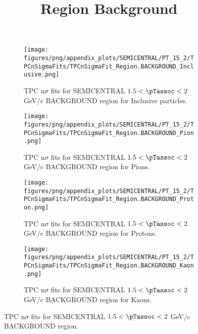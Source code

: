             \begin{figure}[H]
                \title{Region Background}
                \begin{subfigure}[b]{0.5\textwidth}
                    \centering
                    \texttt{[image: figures/png/appendix\_plots/SEMICENTRAL/PT\_15\_2/TPCnSigmaFits/TPCnSigmaFit\_Region.BACKGROUND\_Inclusive.png]}
                    \caption{TPC n$\sigma$ fits for SEMICENTRAL $1.5 < \pTassoc < 2$ GeV/c BACKGROUND region for Inclusive particles.}
                    \label{fig:appendix_SEMICENTRAL_$1.5 < \pTassoc < 2$ GeV/c_BACKGROUND_Inclusive}
                \end{subfigure}
                \begin{subfigure}[b]{0.5\textwidth}
                    \centering
                    \texttt{[image: figures/png/appendix\_plots/SEMICENTRAL/PT\_15\_2/TPCnSigmaFits/TPCnSigmaFit\_Region.BACKGROUND\_Pion.png]}
                    \caption{TPC n$\sigma$ fits for SEMICENTRAL $1.5 < \pTassoc < 2$ GeV/c BACKGROUND region for Pions.}
                    \label{fig:appendix_SEMICENTRAL_$1.5 < \pTassoc < 2$ GeV/c_BACKGROUND_Pion}
                \end{subfigure}
                \begin{subfigure}[b]{0.5\textwidth}
                    \centering
                    \texttt{[image: figures/png/appendix\_plots/SEMICENTRAL/PT\_15\_2/TPCnSigmaFits/TPCnSigmaFit\_Region.BACKGROUND\_Proton.png]}
                    \caption{TPC n$\sigma$ fits for SEMICENTRAL $1.5 < \pTassoc < 2$ GeV/c BACKGROUND region for Protons.}
                    \label{fig:appendix_SEMICENTRAL_$1.5 < \pTassoc < 2$ GeV/c_BACKGROUND_Proton}
                \end{subfigure}
                \begin{subfigure}[b]{0.5\textwidth}
                    \centering
                    \texttt{[image: figures/png/appendix\_plots/SEMICENTRAL/PT\_15\_2/TPCnSigmaFits/TPCnSigmaFit\_Region.BACKGROUND\_Kaon.png]}
                    \caption{TPC n$\sigma$ fits for SEMICENTRAL $1.5 < \pTassoc < 2$ GeV/c BACKGROUND region for Kaons.}
                    \label{fig:appendix_SEMICENTRAL_$1.5 < \pTassoc < 2$ GeV/c_BACKGROUND_Kaon}
                \end{subfigure}
                \caption{TPC n$\sigma$ fits for SEMICENTRAL $1.5 < \pTassoc < 2$ GeV/c BACKGROUND region.}
                \label{fig:appendix_SEMICENTRAL_$1.5 < \pTassoc < 2$ GeV/c_BACKGROUND}
            \end{figure}
            \clearpage
            

